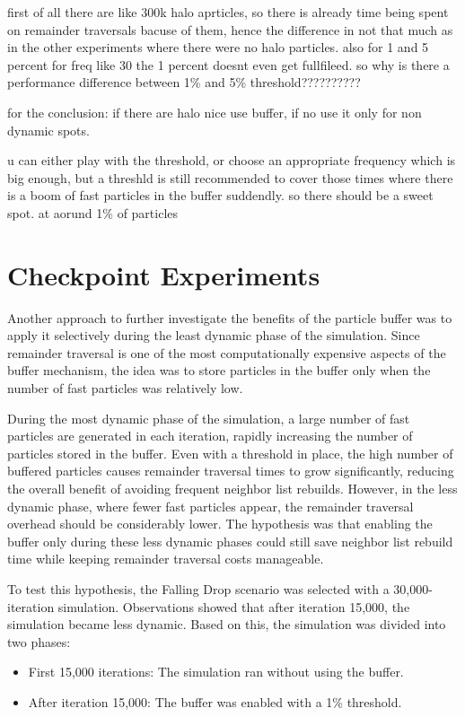 first of all there are like 300k halo aprticles, so there is already time being spent on remainder traversals bacuse of them, hence the difference in not that much as in the other experiments where there were no halo particles. also for 1 and 5 percent for freq like 30 the 1 percent doesnt even get fullfileed. so why is there a performance difference between 1\% and 5\% threshold??????????

for the conclusion: if there are halo nice use buffer, if no use it only for non dynamic spots.

u can either play with the threshold, or choose an appropriate frequency which is big enough, but a threshld is still recommended to cover those times where there is a boom of fast particles in the buffer suddendly. so there should be a sweet spot. at aorund 1\% of particles

\section{Checkpoint Experiments}


Another approach to further investigate the benefits of the particle buffer was to apply it selectively during the least dynamic phase of the simulation. Since remainder traversal is one of the most computationally expensive aspects of the buffer mechanism, the idea was to store particles in the buffer only when the number of fast particles was relatively low.

During the most dynamic phase of the simulation, a large number of fast particles are generated in each iteration, rapidly increasing the number of particles stored in the buffer. Even with a threshold in place, the high number of buffered particles causes remainder traversal times to grow significantly, reducing the overall benefit of avoiding frequent neighbor list rebuilds. However, in the less dynamic phase, where fewer fast particles appear, the remainder traversal overhead should be considerably lower. The hypothesis was that enabling the buffer only during these less dynamic phases could still save neighbor list rebuild time while keeping remainder traversal costs manageable.


To test this hypothesis, the Falling Drop scenario was selected with a 30,000-iteration simulation. Observations showed that after iteration 15,000, the simulation became less dynamic. Based on this, the simulation was divided into two phases:

\begin{itemize}
    \item First 15,000 iterations: The simulation ran without using the buffer.
    \item After iteration 15,000: The buffer was enabled with a 1\% threshold.
\end{itemize}

